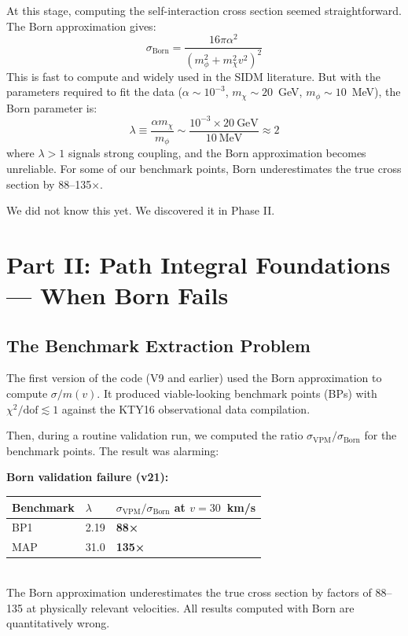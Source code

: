 \documentclass[12pt, a4paper]{article}
\newcommand{\dateentry}[1]{\medskip\noindent{\footnotesize\color{journalgray}\textbf{Date:}~#1}\smallskip}
\begin{document}
At this stage, computing the self-interaction cross section seemed straightforward. The Born approximation gives:
\begin{equation}
  \sigma_\text{Born} = \frac{16\pi\alpha^2}{\left(m_\phi^2 + m_\chi^2 v^2\right)^2}
\end{equation}
This is fast to compute and widely used in the SIDM literature. But with the parameters required to fit the data ($\alpha \sim 10^{-3}$, $m_\chi \sim 20$~GeV, $m_\phi \sim 10$~MeV), the Born parameter is:
\begin{equation}
  \lambda \equiv \frac{\alpha m_\chi}{m_\phi} \sim \frac{10^{-3} \times 20~\text{GeV}}{10~\text{MeV}} \approx 2
\end{equation}
where $\lambda > 1$ signals strong coupling, and the Born approximation becomes unreliable. For some of our benchmark points, Born underestimates the true cross section by 88--135$\times$.

We did not know this yet. We discovered it in Phase II.

\newpage

\section{Part II: Path Integral Foundations --- When Born Fails}

\subsection{The Benchmark Extraction Problem}

\dateentry{January -- February 2026}

The first version of the code (V9 and earlier) used the Born approximation to compute $\sigma/m(v)$. It produced viable-looking benchmark points (BPs) with $\chi^2/\text{dof} \lesssim 1$ against the KTY16 observational data compilation.

Then, during a routine validation run, we computed the ratio $\sigma_\text{VPM}/\sigma_\text{Born}$ for the benchmark points. The result was alarming:

\begin{failbox}
\textbf{Born validation failure (v21):}\\
\begin{tabular}{lll}
  \toprule
  Benchmark & $\lambda$ & $\sigma_\text{VPM}/\sigma_\text{Born}$ at $v=30$~km/s \\
  \midrule
  BP1 & 2.19 & \textbf{88×} \\
  MAP & 31.0 & \textbf{135×} \\
  \bottomrule
\end{tabular}\\[0.5em]
The Born approximation underestimates the true cross section by factors of 88--135 at physically relevant velocities. All results computed with Born are quantitatively wrong.
\end{failbox}
\end{document}
